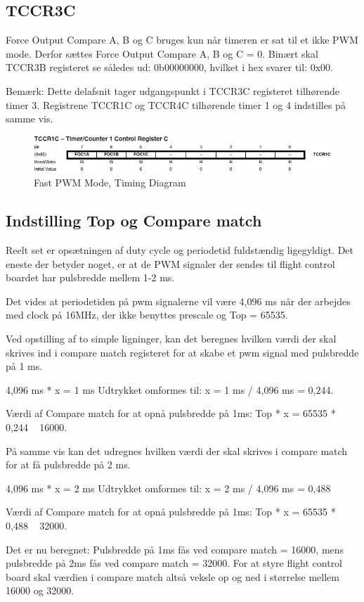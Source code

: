 \subsection*{TCCR3C}
Force Output Compare A, B og C bruges kun når timeren er sat til et ikke PWM mode.  Derfor sættes Force Output Compare A, B og C = 0.
Binært skal TCCR3B registeret se således ud: 0b00000000, hvilket i hex svarer til: 0x00. 

Bemærk: Dette delafsnit tager udgangspunkt i TCCR3C registeret tilhørende timer 3.  Registrene TCCR1C og TCCR4C tilhørende timer 1 og 4 indstilles på samme vis.

\begin{figure}[H]
	\centering
	\includegraphics[width=1.\textwidth]{Billeder/Timer/6_TCCT3C.png}
	\caption{Fast PWM Mode, Timing Diagram}
	\label{fig:Timing_diagram}
\end{figure}
 
\vspace{1cm}

\subsection*{Indstilling Top og Compare match}
Reelt set er opsætningen af duty cycle og periodetid fuldstændig ligegyldigt. Det eneste der betyder noget, er at de PWM signaler der sendes til flight control boardet har pulsbredde mellem 1-2 ms.
 
Det vides at periodetiden på pwm signalerne vil være 4,096 ms når der arbejdes med clock på 16MHz, der ikke benyttes prescale og Top = 65535.

Ved opstilling af to simple ligninger, kan det beregnes hvilken værdi der skal skrives ind i compare match registeret for at skabe et pwm signal med pulsbredde på 1 ms.  

4,096 ms * x = 1 ms	Udtrykket omformes til: 	x = 1 ms / 4,096 ms = 0,244.

Værdi af Compare match for at opnå pulsbredde på 1ms:  Top * x = 65535 * 0,244 ~ 16000.

På samme vis kan det udregnes hvilken værdi der skal skrives i compare match for at få pulsbredde på 2 ms.

4,096 ms * x = 2 ms	Udtrykket omformes til: 	x = 2 ms / 4,096 ms = 0,488

Værdi af Compare match for at opnå pulsbredde på 1ms:  Top * x = 65535 * 0,488 ~ 32000.

Det er nu beregnet: Pulsbredde på 1ms fås ved compare match = 16000, mens pulsbredde på 2ms fås ved compare match = 32000. For at styre flight control board skal værdien i compare match altså veksle op og ned i størrelse mellem 16000 og 32000. 







